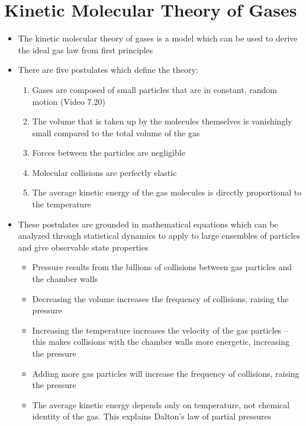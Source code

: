 \documentclass[12pt, openany, letterpaper]{memoir}
\begin{document}
\section{Kinetic Molecular Theory of Gases}
\begin{itemize}
	\item The kinetic molecular theory of gases is a model which can be used to derive the ideal gas law from first principles
	\item There are five postulates which define the theory:
	\begin{enumerate}
		\item Gases are composed of small particles that are in constant, random motion (Video 7.20)
		\item The volume that is taken up by the molecules themselves is vanishingly small compared to the total volume of the gas
		\item Forces between the particles are negligible
		\item Molecular collisions are perfectly elastic
		\item The average kinetic energy of the gas molecules is directly proportional to the temperature
	\end{enumerate}
	\item These postulates are grounded in mathematical equations which can be analyzed through statistical dynamics to apply to large ensembles of particles and give observable state properties
	\begin{itemize}
		\item Pressure results from the billions of collisions between gas particles and the chamber walls
		\item Decreasing the volume increases the frequency of collisions, raising the pressure
		\item Increasing the temperature increases the velocity of the gas particles -- this makes collisions with the chamber walls more energetic, increasing the pressure
		\item Adding more gas particles will increase the frequency of collisions, raising the pressure
		\item The average kinetic energy depends only on temperature, not chemical identity of the gas. This explains Dalton's law of partial pressures 
	\end{itemize}
\end{itemize}
\end{document}
